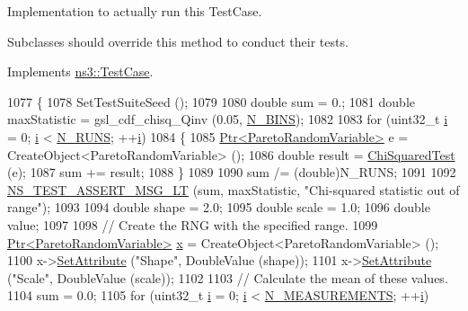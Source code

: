 Implementation to actually run this Test\+Case. 

Subclasses should override this method to conduct their tests. 

Implements \hyperlink{classns3_1_1TestCase_a8ff74680cf017ed42011e4be51917a24}{ns3\+::\+Test\+Case}.


\begin{DoxyCode}
1077 \{
1078   SetTestSuiteSeed ();
1079 
1080   \textcolor{keywordtype}{double} sum = 0.;
1081   \textcolor{keywordtype}{double} maxStatistic = gsl\_cdf\_chisq\_Qinv (0.05, \hyperlink{classRandomVariableStreamParetoTestCase_a12b68170c60cd4da893e455d79334d08}{N\_BINS});
1082 
1083   \textcolor{keywordflow}{for} (uint32\_t \hyperlink{bernuolliDistribution_8m_a6f6ccfcf58b31cb6412107d9d5281426}{i} = 0; \hyperlink{bernuolliDistribution_8m_a6f6ccfcf58b31cb6412107d9d5281426}{i} < \hyperlink{classRandomVariableStreamParetoTestCase_a3dca9876bb2898a06f20edf03c8c12a2}{N\_RUNS}; ++\hyperlink{bernuolliDistribution_8m_a6f6ccfcf58b31cb6412107d9d5281426}{i})
1084     \{
1085       \hyperlink{classns3_1_1Ptr}{Ptr<ParetoRandomVariable>} e = CreateObject<ParetoRandomVariable> ();
1086       \textcolor{keywordtype}{double} result = \hyperlink{classRandomVariableStreamParetoTestCase_aeb87f99dd807d1b34a956d2569d845cb}{ChiSquaredTest} (e);
1087       sum += result;
1088     \}
1089 
1090   sum /= (double)N\_RUNS;
1091 
1092   \hyperlink{group__testing_ga1d96848b91407c9a0b36583e8b0ad7ae}{NS\_TEST\_ASSERT\_MSG\_LT} (sum, maxStatistic, \textcolor{stringliteral}{"Chi-squared statistic out of range"});
1093 
1094   \textcolor{keywordtype}{double} shape = 2.0;
1095   \textcolor{keywordtype}{double} scale = 1.0;
1096   \textcolor{keywordtype}{double} value;
1097 
1098   \textcolor{comment}{// Create the RNG with the specified range.}
1099   \hyperlink{classns3_1_1Ptr}{Ptr<ParetoRandomVariable>} \hyperlink{lte__link__budget__x2__handover__measures_8m_a9336ebf25087d91c818ee6e9ec29f8c1}{x} = CreateObject<ParetoRandomVariable> ();
1100   x->\hyperlink{classns3_1_1ObjectBase_ac60245d3ea4123bbc9b1d391f1f6592f}{SetAttribute} (\textcolor{stringliteral}{"Shape"}, DoubleValue (shape));
1101   x->\hyperlink{classns3_1_1ObjectBase_ac60245d3ea4123bbc9b1d391f1f6592f}{SetAttribute} (\textcolor{stringliteral}{"Scale"}, DoubleValue (scale));
1102 
1103   \textcolor{comment}{// Calculate the mean of these values.}
1104   sum = 0.0;
1105   \textcolor{keywordflow}{for} (uint32\_t \hyperlink{bernuolliDistribution_8m_a6f6ccfcf58b31cb6412107d9d5281426}{i} = 0; \hyperlink{bernuolliDistribution_8m_a6f6ccfcf58b31cb6412107d9d5281426}{i} < \hyperlink{classRandomVariableStreamParetoTestCase_af8ae7065d2066c50308876e7566636fd}{N\_MEASUREMENTS}; ++\hyperlink{bernuolliDistribution_8m_a6f6ccfcf58b31cb6412107d9d5281426}{i})

\end{DoxyCode}
